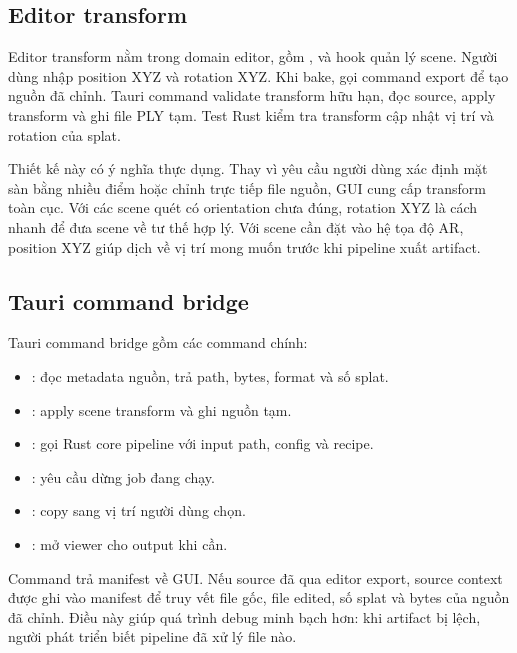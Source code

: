 \subsection{Editor transform}

Editor transform nằm trong domain editor, gồm ,  và hook quản lý scene. Người dùng nhập position XYZ và rotation XYZ. Khi bake,  gọi command export để tạo nguồn đã chỉnh. Tauri command validate transform hữu hạn, đọc source, apply transform và ghi file PLY tạm. Test Rust kiểm tra transform cập nhật vị trí và rotation của splat.

Thiết kế này có ý nghĩa thực dụng. Thay vì yêu cầu người dùng xác định mặt sàn bằng nhiều điểm hoặc chỉnh trực tiếp file nguồn, GUI cung cấp transform toàn cục. Với các scene quét có orientation chưa đúng, rotation XYZ là cách nhanh để đưa scene về tư thế hợp lý. Với scene cần đặt vào hệ tọa độ AR, position XYZ giúp dịch về vị trí mong muốn trước khi pipeline xuất artifact.

\subsection{Tauri command bridge}

Tauri command bridge gồm các command chính:

\begin{itemize}
  \item {}: đọc metadata nguồn, trả path, bytes, format và số splat.
  \item {}: apply scene transform và ghi nguồn tạm.
  \item {}: gọi Rust core pipeline với input path, config và recipe.
  \item {}: yêu cầu dừng job đang chạy.
  \item {}: copy  sang vị trí người dùng chọn.
  \item {}: mở viewer cho output khi cần.
\end{itemize}

Command  trả manifest về GUI. Nếu source đã qua editor export, source context được ghi vào manifest để truy vết file gốc, file edited, số splat và bytes của nguồn đã chỉnh. Điều này giúp quá trình debug minh bạch hơn: khi artifact bị lệch, người phát triển biết pipeline đã xử lý file nào.

